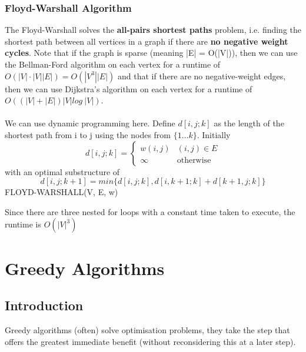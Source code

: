 \documentclass{article}
\begin{document}
        \subsubsection{Floyd-Warshall Algorithm}
            The Floyd-Warshall solves the \textbf{all-pairs shortest paths} problem, i.e. finding the shortest path between all vertices in a graph if there are \textbf{no negative weight cycles}. Note that if the graph is sparse (meaning |E| = O(|V|)), then we can use the Bellman-Ford algorithm on each vertex for a runtime of $O(|V| \cdot |V||E|) = O(|V^3||E|)$ and that if there are no negative-weight edges, then we can use Dijkstra's algorithm on each vertex for a runtime of $O((|V| + |E|)|V|log \: |V|)$. \\ \\
            We can use dynamic programming here. Define $d[i,j;k]$ as the length of the shortest path from i to j using the nodes from $\{1 \dots k\}$. Initially
            \[ d[i,j;k] = 
            \begin{cases} 
                w(i,j) & (i,j) \in E \\
                \infty & \text{otherwise}
            \end{cases}
            \]
            with an optimal substructure of
            \[ d[i,j;k+1] = min\{ d[i,j;k], d[i,k+1;k] + d[k+1,j;k]\} \]
            FLOYD-WARSHALL(V, E, w)
            \begin{algorithmic}[1]
                    \EndFor
                \EndFor
                \EndFor
                        \EndFor
                    \EndFor
                \EndFor
            \end{algorithmic}
            Since there are three nested for loops with a constant time taken to execute, the runtime is $O(|V|^3)$
\section{Greedy Algorithms}
    \subsection{Introduction}
        Greedy algorithms (often) solve optimisation problems, they take the step that offers the greatest immediate benefit (without reconsidering this at a later step). 
\end{document}
